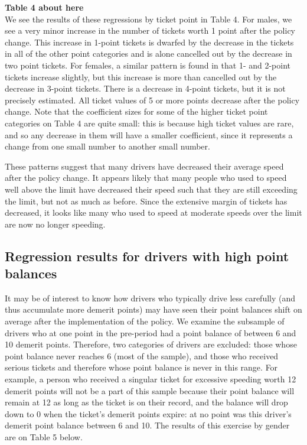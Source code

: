 \textbf{Table 4 about here} \\

We see the results of these regressions by ticket point in Table 4. For males, we see a very minor increase in the number of tickets worth 1 point after the policy change. This increase in 1-point tickets is dwarfed by the decrease in the tickets in all of the other point categories and is alone cancelled out by the decrease in two point tickets. For females, a similar pattern is found in that 1- and 2-point tickets increase slightly, but this increase is more than cancelled out by the decrease in 3-point tickets. There is a decrease in 4-point tickets, but it is not precisely estimated. All ticket values of 5 or more points decrease after the policy change. Note that the coefficient sizes for some of the higher ticket point categories on Table 4 are quite small: this is because high ticket values are rare, and so any decrease in them will have a smaller coefficient, since it represents a change from one small number to another small number.

These patterns suggest that many drivers have decreased their average speed after the policy change. It appears likely that many people who used to speed well above the limit have decreased their speed such that they are still exceeding the limit, but not as much as before. Since the extensive margin of tickets has decreased, it looks like many who used to speed at moderate speeds over the limit are now no longer speeding.


\subsection{Regression results for drivers with high point balances}

It may be of interest to know how drivers who typically drive less carefully (and thus accumulate more demerit points) may have seen their point balances shift on average after the implementation of the policy. We examine the subsample of drivers who at one point in the pre-period had a point balance of between 6 and 10 demerit points. Therefore, two categories of drivers are excluded: those whose point balance never reaches 6 (most of the sample), and those who received serious tickets and therefore whose point balance is never in this range. For example, a person who received a singular ticket for excessive speeding worth 12 demerit points will not be a part of this sample because their point balance will remain at 12 as long as the ticket is on their record, and the balance will drop down to 0 when the ticket’s demerit points expire: at no point was this driver’s demerit point balance between 6 and 10. The results of this exercise by gender are on Table 5 below. \\

